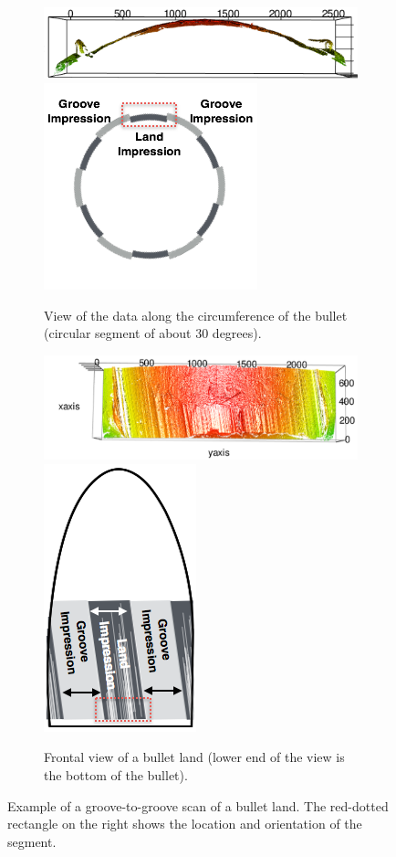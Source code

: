\documentclass[aoas, preprint]{imsart}\usepackage[]{graphicx}\usepackage[]{color}
\begin{document}
\begin{figure}[hbtp]
  \centering
\begin{subfigure}[t]{\textwidth}\centering
\caption{View of the data along the circumference of the bullet (circular segment of about 30 degrees).\label{fig:sidex3p}}{%
      \includegraphics[width=.65\textwidth]{sidex3p.png}
      \hspace{1cm}
      \includegraphics[width=.25\textwidth]{side-sketch.png}
    }
\end{subfigure}    
\begin{subfigure}[t]{\textwidth}\centering
    \caption{Frontal view of a bullet land (lower end of the view is the bottom of the bullet). \label{fig:topx3p}}{%
    \includegraphics[width=.65\textwidth]{topx3p.png} \hspace{1cm}
    \includegraphics[width=.15\textwidth]{top-sketch.png}
    }
\end{subfigure}
\caption{Example of a groove-to-groove scan of a bullet land. The red-dotted rectangle on the right shows the location and orientation of the segment. }
\end{figure}
\end{document}
